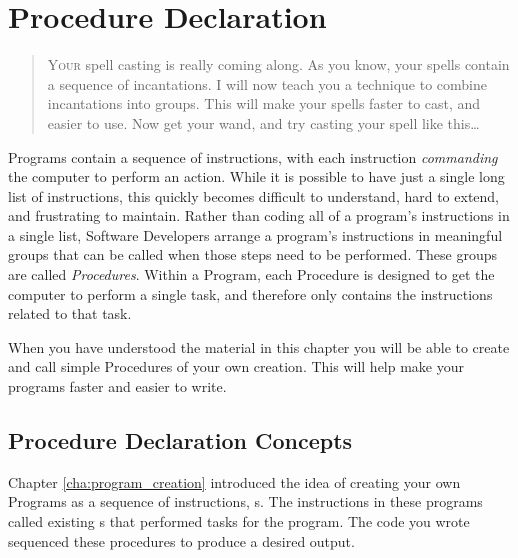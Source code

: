 \chapter{Procedure Declaration} %
\label{cha:procedure_declaration}

\begin{quote}
  \Fontlukas\Large
  \renewcommand{\LettrineTextFont}{\relax}
  \lettrine[image=true,lines=3,lraise=0.1]
  {Y}{our} spell casting is really coming along. As you know, your spells contain a sequence of incantations. I will now teach you a technique to combine incantations into groups. This will make your spells faster to cast, and easier to use. Now get your wand, and try casting your spell like this\ldots
\end{quote}

\bigskip

Programs contain a sequence of instructions, with each instruction \emph{commanding} the computer to perform an action. While it is possible to have just a single long list of instructions, this quickly becomes difficult to understand, hard to extend, and frustrating to maintain. Rather than coding all of a program's instructions in a single list, Software Developers arrange a program's instructions in meaningful groups that can be called when those steps need to be performed. These groups are called \emph{Procedures}. Within a Program, each Procedure is designed to get the computer to perform a single task, and therefore only contains the instructions related to that task.

When you have understood the material in this chapter you will be able to create and call simple Procedures of your own creation. This will help make your programs faster and easier to write.

\minitoc

\clearpage
\section{Procedure Declaration Concepts} %
\label{sec:procedure_declaration_concepts}

Chapter \ref{cha:program_creation}  introduced the idea of creating your own Programs as a sequence of instructions, s. The instructions in these programs called existing s that performed tasks for the program. The code you wrote sequenced these procedures to produce a desired output.

